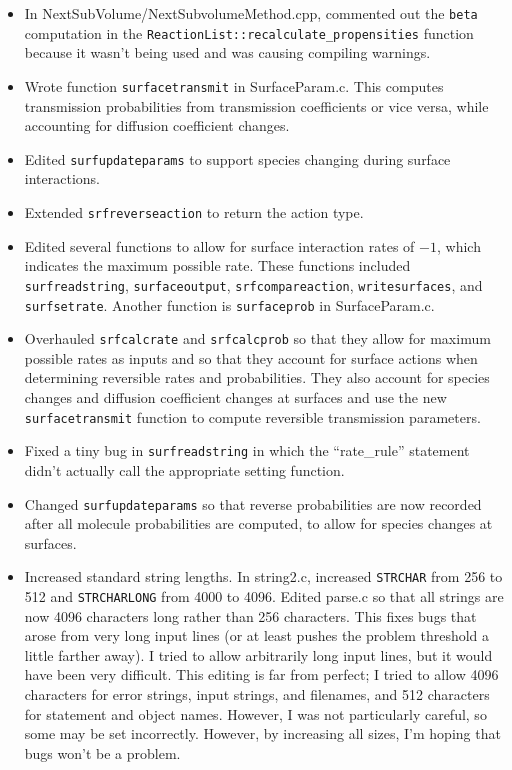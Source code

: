 \documentclass {scrbook}
\newcommand {\ttt} {\texttt}
\begin{document}
\begin{itemize}
\item In NextSubVolume/NextSubvolumeMethod.cpp, commented out the \ttt{beta} computation in the \ttt{ReactionList::recalculate\_propensities} function because it wasn't being used and was causing compiling warnings.
\item Wrote function \ttt{surfacetransmit} in SurfaceParam.c. This computes transmission probabilities from transmission coefficients or vice versa, while accounting for diffusion coefficient changes.
\item Edited \ttt{surfupdateparams} to support species changing during surface interactions.
\item Extended \ttt{srfreverseaction} to return the action type.
\item Edited several functions to allow for surface interaction rates of $-1$, which indicates the maximum possible rate. These functions included \ttt{surfreadstring}, \ttt{surfaceoutput}, \ttt{srfcompareaction}, \ttt{writesurfaces}, and \ttt{surfsetrate}. Another function is \ttt{surfaceprob} in SurfaceParam.c.
\item Overhauled \ttt{srfcalcrate} and \ttt{srfcalcprob} so that they allow for maximum possible rates as inputs and so that they account for surface actions when determining reversible rates and probabilities. They also account for species changes and diffusion coefficient changes at surfaces and use the new \ttt{surfacetransmit} function to compute reversible transmission parameters.
\item Fixed a tiny bug in \ttt{surfreadstring} in which the ``rate\_rule'' statement didn't actually call the appropriate setting function.
\item Changed \ttt{surfupdateparams} so that reverse probabilities are now recorded after all molecule probabilities are computed, to allow for species changes at surfaces.
\item Increased standard string lengths. In string2.c, increased \ttt{STRCHAR} from 256 to 512 and \ttt{STRCHARLONG} from 4000 to 4096. Edited parse.c so that all strings are now 4096 characters long rather than 256 characters. This fixes bugs that arose from very long input lines (or at least pushes the problem threshold a little farther away). I tried to allow arbitrarily long input lines, but it would have been very difficult. This editing is far from perfect; I tried to allow 4096 characters for error strings, input strings, and filenames, and 512 characters for statement and object names. However, I was not particularly careful, so some may be set incorrectly. However, by increasing all sizes, I'm hoping that bugs won't be a problem.

\end{itemize}
\end{document}
